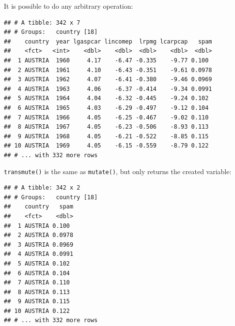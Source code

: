 \documentclass[]{gitbook}
\newenvironment{Shaded}{\begin{snugshade}}{\end{snugshade}}
\newcommand{\DataTypeTok}[1]{\textcolor[rgb]{0.13,0.29,0.53}{#1}}
\newcommand{\KeywordTok}[1]{\textcolor[rgb]{0.13,0.29,0.53}{\textbf{#1}}}
\newcommand{\NormalTok}[1]{#1}
\newcommand{\OperatorTok}[1]{\textcolor[rgb]{0.81,0.36,0.00}{\textbf{#1}}}
\newcommand{\StringTok}[1]{\textcolor[rgb]{0.31,0.60,0.02}{#1}}
\theoremstyle{definition}
\theoremstyle{definition}
\theoremstyle{definition}
\theoremstyle{remark}
\begin{document}
It is possible to do any arbitrary operation:

\begin{Shaded}
\end{Shaded}

\begin{verbatim}
## # A tibble: 342 x 7
## # Groups:   country [18]
##    country  year lgaspcar lincomep  lrpmg lcarpcap   spam
##    <fct>   <int>    <dbl>    <dbl>  <dbl>    <dbl>  <dbl>
##  1 AUSTRIA  1960     4.17    -6.47 -0.335    -9.77 0.100 
##  2 AUSTRIA  1961     4.10    -6.43 -0.351    -9.61 0.0978
##  3 AUSTRIA  1962     4.07    -6.41 -0.380    -9.46 0.0969
##  4 AUSTRIA  1963     4.06    -6.37 -0.414    -9.34 0.0991
##  5 AUSTRIA  1964     4.04    -6.32 -0.445    -9.24 0.102 
##  6 AUSTRIA  1965     4.03    -6.29 -0.497    -9.12 0.104 
##  7 AUSTRIA  1966     4.05    -6.25 -0.467    -9.02 0.110 
##  8 AUSTRIA  1967     4.05    -6.23 -0.506    -8.93 0.113 
##  9 AUSTRIA  1968     4.05    -6.21 -0.522    -8.85 0.115 
## 10 AUSTRIA  1969     4.05    -6.15 -0.559    -8.79 0.122 
## # ... with 332 more rows
\end{verbatim}

\texttt{transmute()} is the same as \texttt{mutate()}, but only returns
the created variable:

\begin{Shaded}
\end{Shaded}

\begin{verbatim}
## # A tibble: 342 x 2
## # Groups:   country [18]
##    country   spam
##    <fct>    <dbl>
##  1 AUSTRIA 0.100 
##  2 AUSTRIA 0.0978
##  3 AUSTRIA 0.0969
##  4 AUSTRIA 0.0991
##  5 AUSTRIA 0.102 
##  6 AUSTRIA 0.104 
##  7 AUSTRIA 0.110 
##  8 AUSTRIA 0.113 
##  9 AUSTRIA 0.115 
## 10 AUSTRIA 0.122 
## # ... with 332 more rows
\end{verbatim}
\end{document}
